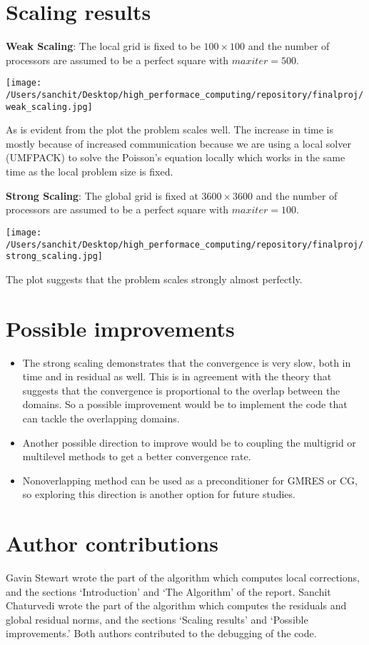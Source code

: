 \documentclass{article}
\begin{document}
	\section{Scaling results}
	\textbf{Weak Scaling}: The local grid is fixed to be $100\times100$ and the number of processors are assumed to be a perfect square with $max iter=500$. 
	
	\texttt{[image: /Users/sanchit/Desktop/high\_performace\_computing/repository/finalproj/weak\_scaling.jpg]}
	
	As is evident from the plot the problem scales well. The increase in time is mostly because of increased communication because we are using a local solver (UMFPACK) to solve the Poisson's equation locally which works in the same time as the local problem size is fixed.
	
	\textbf{Strong Scaling}: The global grid is fixed at $3600\times3600$ and the number of processors are assumed to be a perfect square with $max iter=100$.
	
	\texttt{[image: /Users/sanchit/Desktop/high\_performace\_computing/repository/finalproj/strong\_scaling.jpg]}

The plot suggests that the problem scales strongly almost perfectly. 
	\section{Possible improvements}
	\begin{itemize}
\item	The strong scaling demonstrates that the convergence is very slow, both in time and in residual as well. This is in agreement with the theory that suggests that the convergence is proportional to the overlap between the domains. So a possible improvement would be to implement the code that can tackle the overlapping domains. 
\item Another possible direction to improve would be to coupling the multigrid or multilevel methods to get a better convergence rate.
\item Nonoverlapping method can be used as a preconditioner for GMRES or CG, so exploring this direction is another option for future studies.
	\end{itemize}

	\section{Author contributions}
	
	Gavin Stewart wrote the part of the algorithm which computes local corrections, and the sections `Introduction' and `The Algorithm' of the report.  Sanchit Chaturvedi wrote the part of the algorithm which computes the residuals and global residual norms, and the sections `Scaling results' and `Possible improvements.'  Both authors contributed to the debugging of the code.
	
\end{document}
